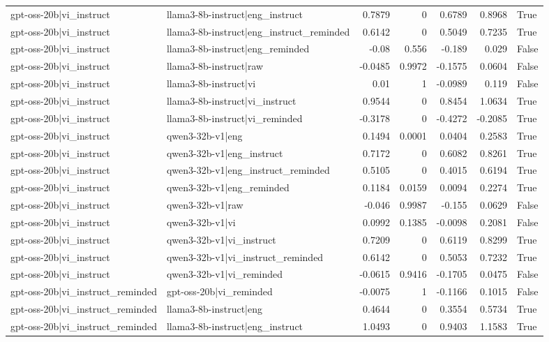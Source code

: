 \begin{table}
\begin{tabular}{l l r r r r l}
gpt-oss-20b|vi_instruct & llama3-8b-instruct|eng_instruct & 0.7879 & 0 & 0.6789 & 0.8968 & True \\
gpt-oss-20b|vi_instruct & llama3-8b-instruct|eng_instruct_reminded & 0.6142 & 0 & 0.5049 & 0.7235 & True \\
gpt-oss-20b|vi_instruct & llama3-8b-instruct|eng_reminded & -0.08 & 0.556 & -0.189 & 0.029 & False \\
gpt-oss-20b|vi_instruct & llama3-8b-instruct|raw & -0.0485 & 0.9972 & -0.1575 & 0.0604 & False \\
gpt-oss-20b|vi_instruct & llama3-8b-instruct|vi & 0.01 & 1 & -0.0989 & 0.119 & False \\
gpt-oss-20b|vi_instruct & llama3-8b-instruct|vi_instruct & 0.9544 & 0 & 0.8454 & 1.0634 & True \\
gpt-oss-20b|vi_instruct & llama3-8b-instruct|vi_reminded & -0.3178 & 0 & -0.4272 & -0.2085 & True \\
gpt-oss-20b|vi_instruct & qwen3-32b-v1|eng & 0.1494 & 0.0001 & 0.0404 & 0.2583 & True \\
gpt-oss-20b|vi_instruct & qwen3-32b-v1|eng_instruct & 0.7172 & 0 & 0.6082 & 0.8261 & True \\
gpt-oss-20b|vi_instruct & qwen3-32b-v1|eng_instruct_reminded & 0.5105 & 0 & 0.4015 & 0.6194 & True \\
gpt-oss-20b|vi_instruct & qwen3-32b-v1|eng_reminded & 0.1184 & 0.0159 & 0.0094 & 0.2274 & True \\
gpt-oss-20b|vi_instruct & qwen3-32b-v1|raw & -0.046 & 0.9987 & -0.155 & 0.0629 & False \\
gpt-oss-20b|vi_instruct & qwen3-32b-v1|vi & 0.0992 & 0.1385 & -0.0098 & 0.2081 & False \\
gpt-oss-20b|vi_instruct & qwen3-32b-v1|vi_instruct & 0.7209 & 0 & 0.6119 & 0.8299 & True \\
gpt-oss-20b|vi_instruct & qwen3-32b-v1|vi_instruct_reminded & 0.6142 & 0 & 0.5053 & 0.7232 & True \\
gpt-oss-20b|vi_instruct & qwen3-32b-v1|vi_reminded & -0.0615 & 0.9416 & -0.1705 & 0.0475 & False \\
gpt-oss-20b|vi_instruct_reminded & gpt-oss-20b|vi_reminded & -0.0075 & 1 & -0.1166 & 0.1015 & False \\
gpt-oss-20b|vi_instruct_reminded & llama3-8b-instruct|eng & 0.4644 & 0 & 0.3554 & 0.5734 & True \\
gpt-oss-20b|vi_instruct_reminded & llama3-8b-instruct|eng_instruct & 1.0493 & 0 & 0.9403 & 1.1583 & True \\

\end{tabular}
\end{table}
